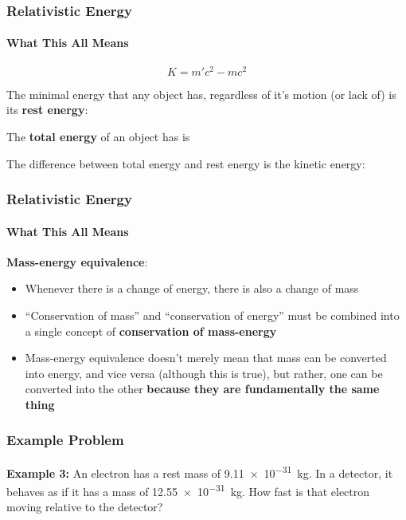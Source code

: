 \documentclass[12pt,compress,aspectratio=169]{beamer}
\newcommand{\eq}[2]{\vspace{#1}{\Large\begin{displaymath}#2\end{displaymath}}}
\begin{document}
\begin{frame}
  \frametitle{Relativistic Energy}
  \framesubtitle{What This All Means}
  {\Large
    \begin{displaymath}
      \boxed{K=m'c^2-mc^2}
    \end{displaymath}
  }

  The minimal energy that any object has, regardless of it's motion (or lack
  of) is its \textbf{rest energy}:
  
  \eq{-.4in}{ E_0=mc^2 }

  \vspace{-.2in}The \textbf{total energy} of an object has is
    
  \eq{-.3in}{
    E_T=m'c^2=\gamma mc^2
  }

  \vspace{-.2in}The difference between total energy and rest energy is the
  kinetic energy:

  \eq{-.3in}{
    K=E_T-E_0
  }
\end{frame}


\begin{frame}
  \frametitle{Relativistic Energy}
  \framesubtitle{What This All Means}
  
  \eq{-.2in}{
    \boxed{E=mc^2}
  }

  \textbf{Mass-energy equivalence}:
  \begin{itemize}
  \item Whenever there is a change of energy, there is also a change of mass
  \item ``Conservation of mass'' and ``conservation of energy'' must be
    combined into a single concept of \textbf{conservation of mass-energy}
  \item Mass-energy equivalence doesn't merely mean that mass can be converted
    into energy, and vice versa (although this is true), but rather, one can be
    converted into the other
    \textbf{because they are fundamentally the same thing}
  \end{itemize}
\end{frame}



\begin{frame}
  \frametitle{Example Problem}
  \textbf{Example 3:} An electron has a rest mass of \SI{9.11e-31}{\kilo\gram}.
  In a detector, it behaves as if it has a mass of \SI{12.55e-31}{\kilo\gram}.
  How fast is that electron moving relative to the detector?
\end{frame}
\end{document}
